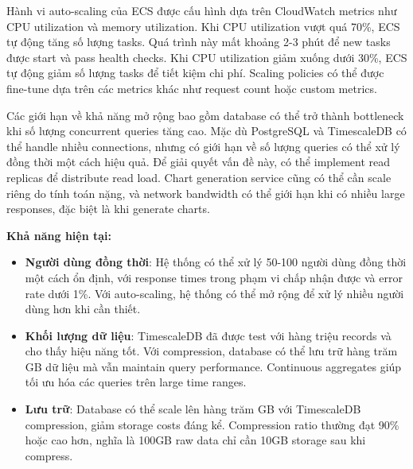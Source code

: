 Hành vi auto-scaling của ECS được cấu hình dựa trên CloudWatch metrics như CPU utilization và memory utilization. Khi CPU utilization vượt quá 70\%, ECS tự động tăng số lượng tasks. Quá trình này mất khoảng 2-3 phút để new tasks được start và pass health checks. Khi CPU utilization giảm xuống dưới 30\%, ECS tự động giảm số lượng tasks để tiết kiệm chi phí. Scaling policies có thể được fine-tune dựa trên các metrics khác như request count hoặc custom metrics.

Các giới hạn về khả năng mở rộng bao gồm database có thể trở thành bottleneck khi số lượng concurrent queries tăng cao. Mặc dù PostgreSQL và TimescaleDB có thể handle nhiều connections, nhưng có giới hạn về số lượng queries có thể xử lý đồng thời một cách hiệu quả. Để giải quyết vấn đề này, có thể implement read replicas để distribute read load. Chart generation service cũng có thể cần scale riêng do tính toán nặng, và network bandwidth có thể giới hạn khi có nhiều large responses, đặc biệt là khi generate charts.

\textbf{Khả năng hiện tại:}
\begin{itemize}
    \item \textbf{Người dùng đồng thời}: Hệ thống có thể xử lý 50-100 người dùng đồng thời một cách ổn định, với response times trong phạm vi chấp nhận được và error rate dưới 1\%. Với auto-scaling, hệ thống có thể mở rộng để xử lý nhiều người dùng hơn khi cần thiết.
    
    \item \textbf{Khối lượng dữ liệu}: TimescaleDB đã được test với hàng triệu records và cho thấy hiệu năng tốt. Với compression, database có thể lưu trữ hàng trăm GB dữ liệu mà vẫn maintain query performance. Continuous aggregates giúp tối ưu hóa các queries trên large time ranges.
    
    \item \textbf{Lưu trữ}: Database có thể scale lên hàng trăm GB với TimescaleDB compression, giảm storage costs đáng kể. Compression ratio thường đạt 90\% hoặc cao hơn, nghĩa là 100GB raw data chỉ cần 10GB storage sau khi compress.
\end{itemize}

